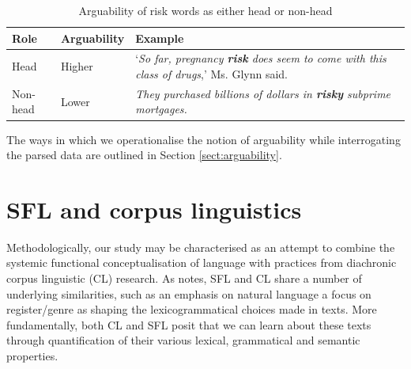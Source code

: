     \begin{table}
    \centering
    \footnotesize
    \begin{tabularx}{.70\textwidth}{|L{.50}|L{.50}|L{2}|}%
    \hline
    \textbf{Role}              & \textbf{Arguability} & \textbf{Example} \\ \hline
    Head           & Higher   & `\emph{So far, pregnancy \textbf{risk} does seem to come with this class of drugs},' Ms. Glynn said.       \\ \hline
    Non-head   & Lower   & \emph{They purchased billions of dollars in \textbf{risky} subprime mortgages.}       \\ \hline
    \end{tabularx}
    \caption{Arguability of risk words as either head or non-head}
    \end{table}

        The ways in which we operationalise the notion of arguability while interrogating the parsed data are outlined in Section \ref{sect:arguability}.

		



	\section{SFL and corpus linguistics}

		Methodologically, our study may be characterised as an attempt to combine the systemic functional conceptualisation of language with practices from diachronic corpus linguistic (CL) research. As  notes, SFL and CL share a number of underlying similarities, such as an emphasis on natural language a focus on register/genre as shaping the lexicogrammatical choices made in texts. More fundamentally, both CL and SFL posit that we can learn about these texts through quantification of their various lexical, grammatical and semantic properties. %


